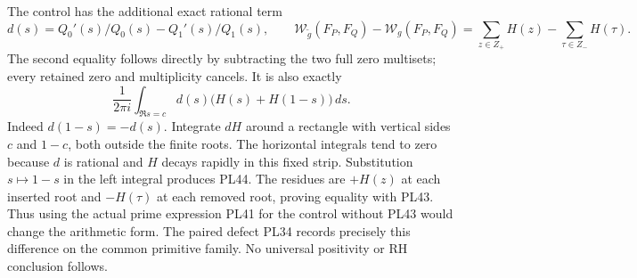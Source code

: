 The control has the additional exact rational term
\[
 d(s)=Q_0'(s)/Q_0(s)-Q_1'(s)/Q_1(s),
 \qquad
 \mathcal W_{\widetilde g}(F_P,F_Q)-\mathcal W_g(F_P,F_Q)
       =\sum_{z\in Z_+}H(z)-\sum_{\tau\in Z_-}H(\tau).
 \tag{PL43}\label{pl:pl:rational}
\]
The second equality follows directly by subtracting the two full
zero multisets; every retained zero and multiplicity cancels.
It is also exactly
\[
 \frac1{2\pi i}\int_{\Re s=c}
                    d(s)\bigl(H(s)+H(1-s)\bigr)\,ds.
 \tag{PL44}
\]
Indeed \(d(1-s)=-d(s)\). Integrate \(dH\) around a rectangle with
vertical sides \(c\) and \(1-c\), both outside the finite roots.
The horizontal integrals tend to zero because \(d\) is rational
and \(H\) decays rapidly in this fixed strip. Substitution
\(s\mapsto1-s\) in the left integral produces PL44. The residues
are \(+H(z)\) at each inserted root and \(-H(\tau)\) at each
removed root, proving equality with PL43.
Thus using the actual prime expression PL41 for the control
without PL43 would change the arithmetic form. The paired defect
PL34 records precisely this difference on the common primitive
family. No universal positivity or RH conclusion follows.

